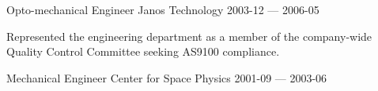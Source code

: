 \begin{cventries}
  \cventry
    {Opto-mechanical Engineer} %
    {Janos Technology} %
    {} %
    {2003-12 — 2006-05} %
    {
      \begin{cvitems} %
        \item {Represented the engineering department as a member of the company-wide Quality Control Committee seeking AS9100 compliance.}
      \end{cvitems}
    }


  \cventry
    {Mechanical Engineer} %
    {Center for Space Physics} %
    {} %
    {2001-09 — 2003-06} %
    {}


\end{cventries}

